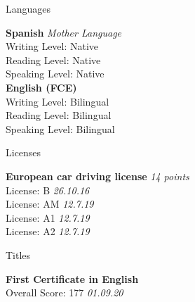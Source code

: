 \documentclass{resume} %
\begin{document}
\begin{rSection}{Languages}

{\bf Spanish} \hfill {\em Mother Language}\\ 
Writing Level: Native \\
Reading Level: Native \\
Speaking Level: Native \\

{\bf English (FCE)} \\ 
Writing Level: Bilingual \\
Reading Level: Bilingual \\
Speaking Level: Bilingual \\

\end{rSection}


\begin{rSection}{Licenses}

{\bf European car driving license} \hfill {\em 14 points}\\ 
License: B \hfill {\em 26.10.16} \\
License: AM \hfill {\em 12.7.19} \\
License: A1 \hfill {\em 12.7.19} \\
License: A2 \hfill {\em 12.7.19} \\

\end{rSection}


\begin{rSection}{Titles}

{\bf First Certificate in English} \\ 
Overall Score: 177 \hfill {\em 01.09.20} \\

\end{rSection}

\end{document}

